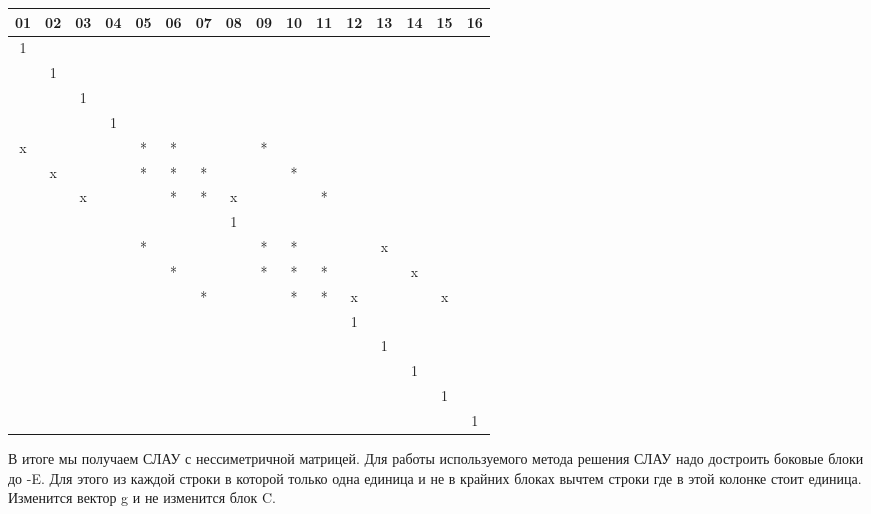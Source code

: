 \begin{center}
\begin{tabular}{ c c c c | c c c c | c c c c | c c c c }
01 & 02 & 03 & 04 & 05 & 06 & 07 & 08 & 09 & 10 & 11 & 12 & 13 & 14 & 15 & 16 \\
\hline 
1 & & & & & & & & & & & & & & & \\
 & 1 & & & & & & & & & & & & & & \\
 & & 1 & & & & & & & & & & & & & \\
 & & & 1 & & & & & & & & & & & & \\
\hline
 x & & & & * & * & & & * & & & & & & & \\
 & x & & & * & * & * & & & * & & & & & & \\
 & & x & & & * & * & x & & & * & & & & & \\
 & & & & & & & 1 & & & & & & & & \\
\hline 
 & & & & * & & & & * & * & & & x & & & \\
 & & & & & * & & & * & * & * & & & x & & \\
 & & & & & & * & & & * & * & x & & & x & \\
 & & & & & & & & & & & 1 & & & & \\
\hline
 & & & & & & & & & & & & 1 & & & \\
 & & & & & & & & & & & & & 1 & & \\
 & & & & & & & & & & & & & & 1 & \\
 & & & & & & & & & & & & & & & 1
\end{tabular}
\end{center}

В итоге мы получаем СЛАУ с нессиметричной матрицей.
Для работы используемого метода решения СЛАУ надо достроить боковые блоки до -E. Для этого из каждой строки в которой только одна единица и не в крайних блоках вычтем строки где в этой колонке стоит единица. Изменится вектор g и не изменится блок C.
